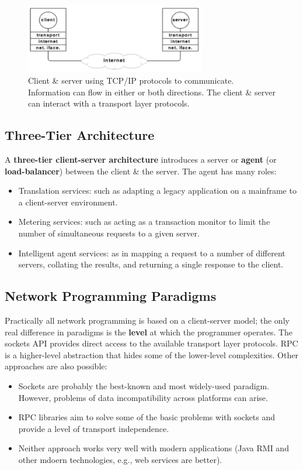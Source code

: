 \documentclass[a4paper,11pt]{article}
\begin{document}
\begin{figure}[H]
    \centering
    \includegraphics[width=0.7\textwidth]{./images/client-server-tcpip.png}
    \caption{
        Client \& server using TCP/IP protocols to communicate.
        Information can flow in either or both directions.
        The client \& server can interact with a transport layer protocols.
    }
\end{figure}

\subsection{Three-Tier Architecture}
A \textbf{three-tier client-server architecture} introduces a server or \textbf{agent} (or \textbf{load-balancer}) between the client \& the server.
The agent has many roles:
\begin{itemize}
    \item   Translation services: such as adapting a legacy application on a mainframe to a client-server environment.
    \item   Metering services: such as acting as a transaction monitor to limit the number of simultaneous requests to a given server.
    \item   Intelligent agent services: as in mapping a request to a number of different servers, collating the results, and returning a single response to the client.
\end{itemize}

\subsection{Network Programming Paradigms}
Practically all network programming is based on a client-server model; the only real difference in paradigms is the \textbf{level} at which the programmer operates.
The sockets API provides direct access to the available transport layer protocols.
RPC is a higher-level abstraction that hides some of the lower-level complexities.
Other approaches are also possible:
\begin{itemize}
    \item   Sockets are probably the best-known and most widely-used paradigm.
            However, problems of data incompatibility across platforms can arise.

    \item   RPC libraries aim to solve some of the basic problems with sockets and provide a level of transport independence.

    \item   Neither approach works very well with modern applications (Java RMI and other mdoern technologies, e.g., web services are better).
\end{itemize}
\end{document}

